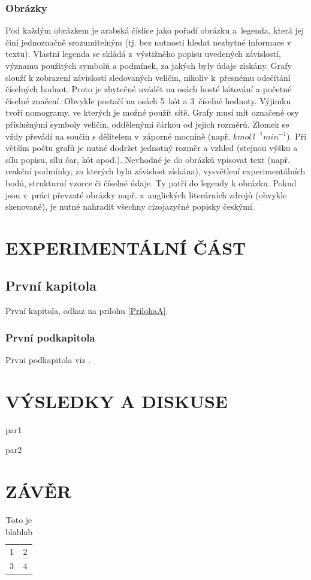 \documentclass[a4paper, 12pt]{article}
\begin{document}
\subsubsection*{Obrázky}
Pod každým obrázkem je arabská číslice jako pořadí obrázku a~legenda, která jej činí jednoznačně srozumitelným (tj. bez nutnosti hledat nezbytné informace v textu). Vlastní legenda se skládá z~výstižného popisu uvedených závislostí, významu použitých symbolů a podmínek, za jakých byly údaje získány.
Grafy slouží k zobrazení závislostí sledovaných veličin, nikoliv k~přesnému odečítání číselných hodnot. Proto je zbytečné uvádět na osách husté kótování a početné číselné značení. Obvykle postačí na osách 5~kót a 3~číselné hodnoty. Výjimku tvoří nomogramy, ve kterých je možné použít sítě. 
Grafy musí mít označené osy příslušnými symboly veličin, oddělenými čárkou od jejich rozměrů. Zlomek se vždy převádí na součin s dělitelem v~záporné mocnině 
(např. $kmol\,l^{-1} min^{-1}$). 
Při větším počtu grafů je nutné dodržet jednotný rozměr a vzhled (stejnou výšku a sílu popisu, sílu čar, kót apod.). Nevhodné je do obrázků vpisovat text (např. reakční podmínky, za kterých byla závislost získána), vysvětlení experimentálních bodů, strukturní vzorce či číselné údaje. Ty patří do legendy k obrázku. 
Pokud jsou v~práci převzaté obrázky např. z~anglických literárních zdrojů (obvykle skenované), je nutné nahradit všechny cizojazyčné popisky českými. 


\newpage
\section{EXPERIMENTÁLNÍ ČÁST}

\subsection{První kapitola}
První kapitola, odkaz na prilohu \ref{PrilohaA}.

\subsubsection{První podkapitola}
Prvni podkapitola viz \cite{HartlandKumar1997}.

\newpage
\section{VÝSLEDKY A DISKUSE}
par1

par2

\newpage
\section{ZÁVĚR}
\begin{table}[h]
\caption{Toto je blablab}
\begin{center}
\begin{tabular}{ll}
\hline
1 & 2\\
3 & 4\\ \hline
\end{tabular}
\end{center}
\end{table}
\end{document}
